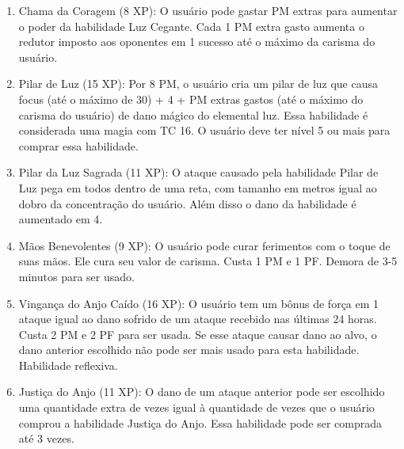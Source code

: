 \begin{enumerate}
 	\item Chama da Coragem (8 XP): O usuário pode gastar PM extras para aumentar o poder da habilidade Luz Cegante. Cada 1 PM extra gasto aumenta o redutor imposto aos oponentes em 1 sucesso até o máximo da carisma do usuário.
 
  	\item Pilar de Luz (15 XP): Por 8 PM, o usuário cria um pilar de luz que causa focus (até o máximo de 30) + 4 + PM extras gastos (até o máximo do carisma do usuário) de dano mágico do elemental luz. Essa habilidade é considerada uma magia com TC 16. O usuário deve ter nível 5 ou mais para comprar essa habilidade.
 	 	
  \item Pilar da Luz Sagrada (11 XP): O ataque causado pela habilidade Pilar de Luz pega em todos dentro de uma reta, com tamanho em metros igual ao dobro da concentração do usuário. Além disso o dano da habilidade é aumentado em 4.

 	\item Mãos Benevolentes (9 XP): O usuário pode curar ferimentos com o toque de suas mãos. Ele cura seu valor de carisma. Custa 1 PM e 1 PF. Demora de 3-5 minutos para ser usado.
 	
  	\item Vingança do Anjo Caído (16 XP): O usuário tem um bônus de força em 1 ataque igual ao dano sofrido de um ataque recebido nas últimas 24 horas. Custa 2 PM e 2 PF para ser usada. Se esse ataque causar dano ao alvo, o dano anterior escolhido não pode ser mais usado para esta habilidade. Habilidade reflexiva.
 	
 
 \item Justiça do Anjo (11 XP): O dano de um ataque anterior pode ser escolhido uma quantidade extra de vezes igual à quantidade de vezes que o usuário comprou a habilidade Justiça do Anjo. Essa habilidade pode ser comprada até 3 vezes.


\end{enumerate}
